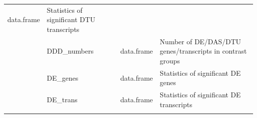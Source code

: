 \documentclass[]{article}
\begin{document}
\begin{longtable}[]{@{}llll@{}}
\begin{minipage}[t]{0.04\columnwidth}
data.frame\strut
\end{minipage} & \begin{minipage}[t]{0.71\columnwidth}\raggedright\strut
Statistics of significant DTU transcripts\strut
\end{minipage}\tabularnewline
\begin{minipage}[t]{0.08\columnwidth}\raggedright\strut
\strut
\end{minipage} & \begin{minipage}[t]{0.06\columnwidth}\raggedright\strut
DDD\_numbers\strut
\end{minipage} & \begin{minipage}[t]{0.04\columnwidth}\raggedright\strut
data.frame\strut
\end{minipage} & \begin{minipage}[t]{0.71\columnwidth}\raggedright\strut
Number of DE/DAS/DTU genes/transcripts in contrast groups\strut
\end{minipage}\tabularnewline
\begin{minipage}[t]{0.08\columnwidth}\raggedright\strut
\strut
\end{minipage} & \begin{minipage}[t]{0.06\columnwidth}\raggedright\strut
DE\_genes\strut
\end{minipage} & \begin{minipage}[t]{0.04\columnwidth}\raggedright\strut
data.frame\strut
\end{minipage} & \begin{minipage}[t]{0.71\columnwidth}\raggedright\strut
Statistics of significant DE genes\strut
\end{minipage}\tabularnewline
\begin{minipage}[t]{0.08\columnwidth}\raggedright\strut
\strut
\end{minipage} & \begin{minipage}[t]{0.06\columnwidth}\raggedright\strut
DE\_trans\strut
\end{minipage} & \begin{minipage}[t]{0.04\columnwidth}\raggedright\strut
data.frame\strut
\end{minipage} & \begin{minipage}[t]{0.71\columnwidth}\raggedright\strut
Statistics of significant DE transcripts\strut
\end{minipage}\tabularnewline
\begin{minipage}[t]{0.08\columnwidth}\raggedright\strut
\strut
\end{minipage} & \begin{minipage}[t]{0.06\columnwidth}\raggedright\strut

\end{minipage}
\end{longtable}
\end{document}
